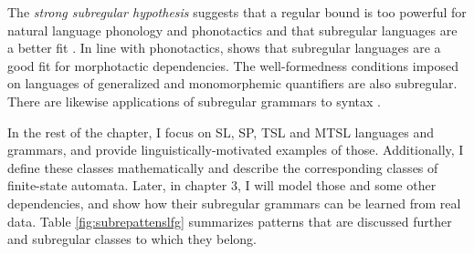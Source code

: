 The \emph{strong subregular hypothesis} suggests that a regular bound is too powerful for natural language phonology and phonotactics and that subregular languages are a better fit \citep{Heinz10ldp}.
In line with phonotactics, \cite{AksenovaEtAl16} shows that subregular languages are a good fit for morphotactic dependencies.
The well-formedness conditions imposed on languages of generalized and monomorphemic quantifiers are also subregular.
There are likewise applications of subregular grammars to syntax  \citep{Graf17Rutgerstalk,DeSantoGrafDrury2017,VuEtAl19SCiL}.

In the rest of the chapter, I focus on SL, SP, TSL and MTSL languages and grammars, and provide linguistically-motivated examples of those.
Additionally, I define these classes mathematically and describe the corresponding classes of finite-state automata.
Later, in chapter 3, I will model those and some other dependencies, and show how their subregular grammars can be learned from real data.
Table \ref{fig:subrepattenslfg} summarizes patterns that are discussed further and subregular classes to which they belong.


